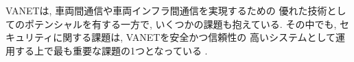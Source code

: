 VANETは, 車両間通信や車両インフラ間通信を実現するための
優れた技術としてのポテンシャルを有する一方で, 
いくつかの課題も抱えている.
その中でも, セキュリティに関する課題は, VANETを安全かつ信頼性の
高いシステムとして運用する上で最も重要な課題の1つとなっている
\cite{vanet-challenge,vanet-security}.\\

